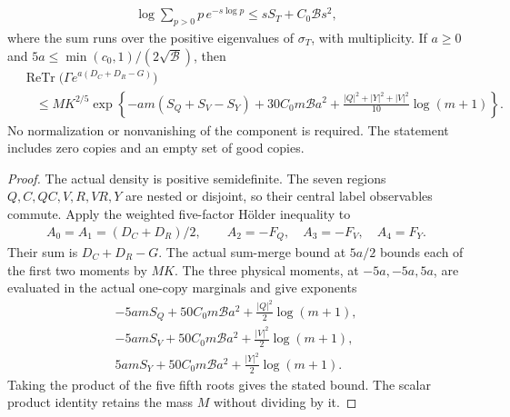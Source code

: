 \begin{theorem}
\begin{align*}
 \log\!\sum_{p>0}p\,e^{-s\log p}
 \le sS_T+C_0\mathcal B s^2,
\end{align*}
where the sum runs over the positive eigenvalues of $\sigma_T$, with
multiplicity. If $a\ge0$ and
$5a\le\min(c_0,1)/(2\sqrt{\mathcal B})$, then
\begin{align*}
 &\operatorname{ReTr}\bigl(\Gamma e^{a(D_C+D_R-G)}\bigr)\\
 &\quad\le M K^{2/5}\exp\!\left\{
 -am(S_Q+S_V-S_Y)+30C_0m\mathcal B a^2
 +\frac{|Q|^2+|Y|^2+|V|^2}{10}\log(m+1)\right\}.
\end{align*}
No normalization or nonvanishing of the component is required. The
statement includes zero copies and an empty set of good copies.
\end{theorem}

\begin{proof}
\leanok
The actual density is positive semidefinite. The seven regions
$Q,C,QC,V,R,VR,Y$ are nested or disjoint, so their central label
observables commute. Apply the weighted five-factor H\"older inequality to
\begin{align*}
 A_0=A_1=(D_C+D_R)/2,\qquad
 A_2=-F_Q,\quad A_3=-F_V,\quad A_4=F_Y.
\end{align*}
Their sum is $D_C+D_R-G$. The actual sum-merge bound at $5a/2$ bounds
each of the first two moments by $MK$. The three physical moments, at
$-5a,-5a,5a$, are evaluated in the actual one-copy marginals and give
exponents
\begin{align*}
 -5amS_Q+50C_0m\mathcal B a^2+\tfrac{|Q|^2}{2}\log(m+1),\\
 -5amS_V+50C_0m\mathcal B a^2+\tfrac{|V|^2}{2}\log(m+1),\\
  5amS_Y+50C_0m\mathcal B a^2+\tfrac{|Y|^2}{2}\log(m+1).
\end{align*}
Taking the product of the five fifth roots gives the stated bound. The
scalar product identity retains the mass $M$ without dividing by it.
\end{proof}
